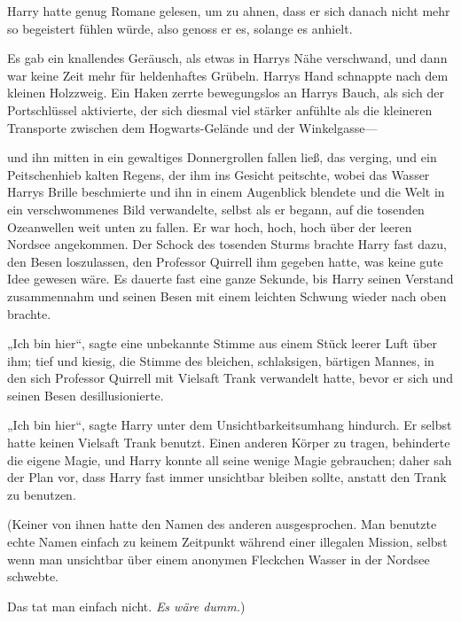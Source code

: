 {Harry hatte genug Romane gelesen, um zu ahnen, dass er sich danach nicht mehr so begeistert fühlen würde, also genoss er es, solange es anhielt.

Es gab ein knallendes Geräusch, als etwas in Harrys Nähe verschwand, und dann war keine Zeit mehr für heldenhaftes Grübeln. Harrys Hand schnappte nach dem kleinen Holzzweig. Ein Haken zerrte bewegungslos an Harrys Bauch, als sich der Portschlüssel aktivierte, der sich diesmal viel stärker anfühlte als die kleineren Transporte zwischen dem Hogwarts-Gelände und der Winkelgasse—

und ihn mitten in ein gewaltiges Donnergrollen fallen ließ, das verging, und ein Peitschenhieb kalten Regens, der ihm ins Gesicht peitschte, wobei das Wasser Harrys Brille beschmierte und ihn in einem Augenblick blendete und die Welt in ein verschwommenes Bild verwandelte, selbst als er begann, auf die tosenden Ozeanwellen weit unten zu fallen. Er war hoch, hoch, hoch über der leeren Nordsee angekommen. Der Schock des tosenden Sturms brachte Harry fast dazu, den Besen loszulassen, den Professor Quirrell ihm gegeben hatte, was keine gute Idee gewesen wäre. Es dauerte fast eine ganze Sekunde, bis Harry seinen Verstand zusammennahm und seinen Besen mit einem leichten Schwung wieder nach oben brachte.

„Ich bin hier“, sagte eine unbekannte Stimme aus einem Stück leerer Luft über ihm; tief und kiesig, die Stimme des bleichen, schlaksigen, bärtigen Mannes, in den sich Professor Quirrell mit Vielsaft Trank verwandelt hatte, bevor er sich und seinen Besen desillusionierte.

„Ich bin hier“, sagte Harry unter dem Unsichtbarkeitsumhang hindurch. Er selbst hatte keinen Vielsaft Trank benutzt. Einen anderen Körper zu tragen, behinderte die eigene Magie, und Harry konnte all seine wenige Magie gebrauchen; daher sah der Plan vor, dass Harry fast immer unsichtbar bleiben sollte, anstatt den Trank zu benutzen.

(Keiner von ihnen hatte den Namen des anderen ausgesprochen. Man benutzte echte Namen einfach zu keinem Zeitpunkt während einer illegalen Mission, selbst wenn man unsichtbar über einem anonymen Fleckchen Wasser in der Nordsee schwebte.

Das tat man einfach nicht. \emph{Es wäre dumm.})

}
